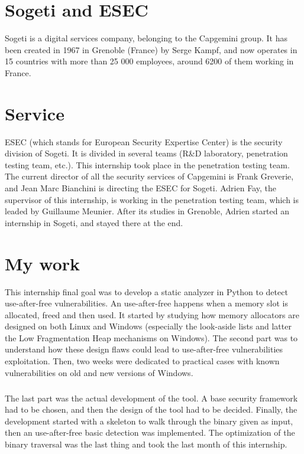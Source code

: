\documentclass[a4paper, 12pt]{report}
\begin{document}
\section*{Sogeti and ESEC}
Sogeti is a digital services company, belonging to the Capgemini group. It has been created in 1967 in Grenoble (France) by Serge Kampf,
and now operates in 15 countries with more than 25 000 employees, around 6200 of them working in France.
\section*{Service}
ESEC (which stands for European Security Expertise Center) is the security division of Sogeti. It is divided in several teams (R\&D laboratory,
penetration testing team, etc.). This internship took place in the penetration testing team.
The current director of all the security services of Capgemini is Frank Greverie, and Jean Marc Bianchini is directing the ESEC for Sogeti.
Adrien Fay, the supervisor of this internship, is working in the penetration testing team, which is leaded by Guillaume Meunier.
After its studies in Grenoble, Adrien started an internship in Sogeti, and stayed there at the end.
\section*{My work}
This internship final goal was to develop a static analyzer in Python to detect use-after-free vulnerabilities. An use-after-free happens when a memory slot is allocated, freed and then used. It started by studying how memory allocators are designed on both Linux and Windows (especially the
look-aside lists and latter the Low Fragmentation Heap mechanisms on Windows). The second part was to understand how these design
flaws could lead to use-after-free vulnerabilities exploitation.
Then, two weeks were dedicated to practical cases with known vulnerabilities on old and new versions of Windows.
\subparagraph{}
The last part was the actual development of the tool. A base security framework had to be chosen, and then the design of the tool had to be
decided. Finally, the development started with a skeleton to walk through the binary given as input, then an use-after-free basic detection
was implemented. The optimization of the binary traversal was the last thing and took the last month of this internship.
\end{document}

